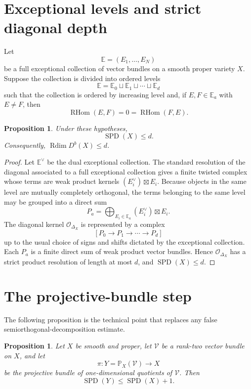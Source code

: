 \documentclass[11pt]{amsart}
\numberwithin{equation}{section}
\newtheorem{proposition}[theorem]{Proposition}
\theoremstyle{definition}
\DeclareMathOperator{\Rdim}{Rdim}
\DeclareMathOperator{\RHom}{RHom}
\DeclareMathOperator{\SPD}{SPD}
\begin{document}
\section{Exceptional levels and strict diagonal depth}

Let
\[
\mathbb E=(E_1,\dots,E_N)
\]
be a full exceptional collection of vector bundles on a smooth proper variety $X$. Suppose the collection is divided into ordered levels
\[
\mathbb E=\mathbb E_0\sqcup\mathbb E_1\sqcup\cdots\sqcup\mathbb E_d
\]
such that the collection is ordered by increasing level and, if $E,F\in\mathbb E_a$ with $E\ne F$, then
\[
\RHom(E,F)=0=\RHom(F,E).
\]

\begin{proposition}
Under these hypotheses,
\[
\SPD(X)\le d.
\]
Consequently, $\Rdim D^b(X)\le d$.
\end{proposition}

\begin{proof}
Let $\mathbb E^\vee$ be the dual exceptional collection. The standard resolution of the diagonal associated to a full exceptional collection gives a finite twisted complex whose terms are weak product kernels $(E_i^\vee)\boxtimes E_i$. Because objects in the same level are mutually completely orthogonal, the terms belonging to the same level may be grouped into a direct sum
\[
P_a=\bigoplus_{E_i\in\mathbb E_a}(E_i^\vee)\boxtimes E_i.
\]
The diagonal kernel $\mathcal O_{\Delta_X}$ is represented by a complex
\[
\left[
P_0\to P_1\to\cdots\to P_d
\right]
\]
up to the usual choice of signs and shifts dictated by the exceptional collection. Each $P_a$ is a finite direct sum of weak product vector bundles. Hence $\mathcal O_{\Delta_X}$ has a strict product resolution of length at most $d$, and $\SPD(X)\le d$.
\end{proof}

\section{The projective-bundle step}

The following proposition is the technical point that replaces any false semiorthogonal-decomposition estimate.

\begin{proposition}
Let $X$ be smooth and proper, let $\mathcal V$ be a rank-two vector bundle on $X$, and let
\[
\pi:Y=\mathbb P_X(\mathcal V)\to X
\]
be the projective bundle of one-dimensional quotients of $\mathcal V$. Then
\[
\SPD(Y)\le \SPD(X)+1.
\]
\end{proposition}
\end{document}

